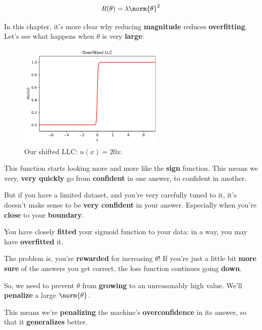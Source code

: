         \begin{equation}
            R(\theta)=\lambda \norm{\theta}^2
        \end{equation}
        
        In this chapter, it's more clear why reducing \textbf{magnitude} reduces \textbf{overfitting}. Let's see what happens when $\theta$ is very \textbf{large}:
        
        \begin{figure}[H]
            \centering
            \includegraphics[width=70mm,scale=0.5]{images/classification_images/theta_x20.png}
            \caption*{Our shifted LLC: $u(x)=20x$.}
        \end{figure}
        
        This function starts looking more and more like the \textbf{sign} function. This means we very, \textbf{very quickly} go from \textbf{confident} in one answer, to confident in another.
        
        But if you have a limited dataset, and you're very carefully tuned to it, it's doesn't make sense to be \textbf{very confident} in your answer. Especially when you're \textbf{close} to your \textbf{boundary}.
        
        You have closely \textbf{fitted} your sigmoid function to your data: in a way, you may have \textbf{overfitted} it.
        
        The problem is, you're \textbf{rewarded} for increasing $\theta$! If you're just a little bit \textbf{more sure} of the answers you get correct, the loss function continues going \textbf{down}.
        
        So, we need to prevent $\theta$ from \textbf{growing} to an unreasonably high value. We'll \textbf{penalize} a large $\norm{\theta}$.
        
        This means we're \textbf{penalizing} the machine's \textbf{overconfidence} in its answer, so that it \textbf{generalizes} better.\\
        
